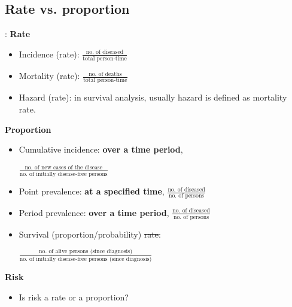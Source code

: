 \subsection{Rate vs. proportion}
\begin{frame}{\secname: \subsecname}
\textbf{Rate}
\begin{itemize}
	  \item<2|handout:2-> Incidence (rate): $\frac{\text{no. of diseased}}{\text{total person-time}}$
	  \item<3|handout:3-> Mortality (rate): $\frac{\text{no. of deaths}}{\text{total person-time}}$
	  \item<4|handout:4-> Hazard (rate): in survival analysis, usually hazard is defined as mortality rate.
	  \end{itemize}
\textbf{Proportion}
	\begin{itemize}
	\item<5|handout:5-> Cumulative incidence: \textbf{over a time period}, \begin{small}
 	$\frac{\text{no. of new cases of the disease}}{\text{no. of initially disease-free persons}}$
 \end{small}

	\item<6|handout:6-> Point prevalence: \textbf{at a specified time}, $\frac{\text{no. of diseased}}{\text{no. of persons}}$
	\item<7|handout:7-> Period prevalence: \textbf{over a time period}, $\frac{\text{no. of diseased}}{\text{no. of persons}}$
	\item<8|handout:8-> Survival (proportion/probability) \st{rate}: \begin{center}
 	$\frac{\text{no. of alive persons (since diagnosis)}}{\text{no. of initially disease-free persons (since diagnosis)}}$
 \end{center}
	\end{itemize}
\textbf{Risk}
	\begin{itemize}
	\item<9|handout:9-> Is risk a rate or a proportion?	
	\end{itemize}

\end{frame}

